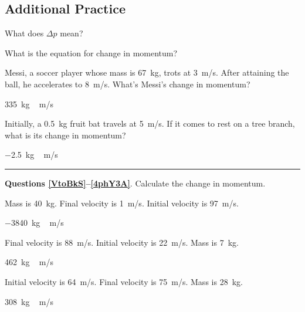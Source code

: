 \documentclass[]{exam}
\begin{document}
\begin{questions}
\end{questions}

\clearpage

\subsection*{Additional Practice}

\begin{questions}
\question
What does $\Delta p$ mean?


\question
What is the equation for change in momentum? 


\question \label{Isttuf}
Messi, a soccer player whose mass is \SI{67}{kg}, trots at \SI{3}{m/s}. After attaining the ball, he accelerates to \SI{8}{m/s}. What's Messi's change in momentum? 

\begin{solution}
\SI{335}{kg\,m/s}
\end{solution}


\question \label{1vMk6B}
Initially, a \SI{0.5}{kg} fruit bat travels at \SI{5}{m/s}. If it comes to rest on a tree branch, what is its change in momentum?

\begin{solution}
\SI{-2.5}{kg\,m/s}
\end{solution}

\bigskip

\hrule

\begin{EnvUplevel}
    \textbf{Questions \ref{VtoBkS}--\ref{4phY3A}}. Calculate the change in momentum.
\end{EnvUplevel}



\question \label{VtoBkS}
Mass is \SI{40}{kg}. Final velocity is \SI{1}{m/s}. Initial velocity is \SI{97}{m/s}.

\begin{solution}
\SI{-3840}{kg\,m/s}
\end{solution}

\question \label{fhENr6}
Final velocity is \SI{88}{m/s}. Initial velocity is \SI{22}{m/s}. Mass is \SI{7}{kg}.

\begin{solution}
\SI{462}{kg\,m/s}
\end{solution}


\question \label{MqRZuz}
Initial velocity is \SI{64}{m/s}. Final velocity is \SI{75}{m/s}. Mass is \SI{28}{kg}.

\begin{solution}
\SI{308}{kg\,m/s}
\end{solution}



\end{questions}
\end{document}

